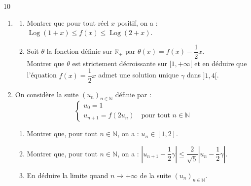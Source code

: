 \documentclass{axiobac}
\begin{document}
\begin{probleme}{10}
\begin{enumerate}
    \item
    \begin{enumerate}
        \item Montrer que pour tout réel $x$ positif, on a : $\operatorname{Log}(1 + x) \leqslant f(x) \leqslant \operatorname{Log}(2 + x)$.
        \item Soit $\theta$ la fonction définie sur $\mathbb{R}_+$ par $\theta(x) = f(x) - \dfrac{1}{2}x$. \\
        Montrer que $\theta$ est strictement décroissante sur $[1, +\infty[$ et en déduire que l'équation $f(x) = \dfrac{1}{2}x$ admet une solution unique $\gamma$ dans $]1, 4[$.
    \end{enumerate}
    \item On considère la suite $(u_n)_{n \in \mathbb{N}}$ définie par :
    \[
    \begin{cases}
        u_0 = 1 \\
        u_{n+1} = f(2u_n) \quad \text{pour tout } n \in \mathbb{N}
    \end{cases}
    \]
    \begin{enumerate}
        \item Montrer que, pour tout $n \in \mathbb{N}$, on a : $u_n \in [1, 2]$.
        \item Montrer que, pour tout $n \in \mathbb{N}$, on a : $\left|u_{n+1} - \dfrac{1}{2}\gamma\right| \leqslant \dfrac{2}{\sqrt{5}} \left|u_n - \dfrac{1}{2}\gamma\right|$.
        \item En déduire la limite quand $n \to +\infty$ de la suite $(u_n)_{n \in \mathbb{N}}$.
    \end{enumerate}
\end{enumerate}

\end{probleme}
\end{document}
